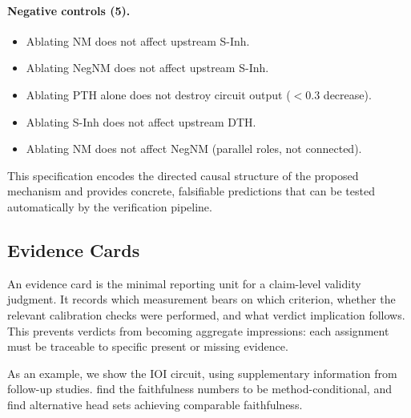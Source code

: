 \documentclass{article}
\begin{document}
\paragraph{Negative controls (5).}
\begin{itemize}[nosep]
    \item Ablating NM does not affect upstream S-Inh.
    \item Ablating NegNM does not affect upstream S-Inh.
    \item Ablating PTH alone does not destroy circuit output ($< 0.3$ decrease).
    \item Ablating S-Inh does not affect upstream DTH.
    \item Ablating NM does not affect NegNM (parallel roles, not connected).
\end{itemize}

This specification encodes the directed causal structure of the proposed mechanism and provides concrete, falsifiable predictions that can be tested automatically by the verification pipeline.

\subsection{Evidence Cards}

\label{appendix:evidence-cards}


An evidence card is the minimal reporting unit for a claim-level validity judgment.
It records which measurement bears on which criterion, whether the relevant
calibration checks were performed, and what verdict implication follows.
This prevents verdicts from becoming aggregate impressions: each assignment must
be traceable to specific present or missing evidence.

As an example, we show the IOI circuit, using supplementary information from follow-up studies.
\citep{miller2024transformer} find the faithfulness numbers to be method-conditional, and \citep{meloux2025everything} find alternative head sets achieving comparable faithfulness.
\end{document}
